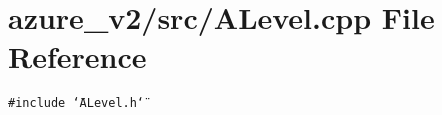 \section{azure\_\-v2/src/ALevel.cpp File Reference}
\label{ALevel_8cpp}
{\tt \#include \char`\"{}ALevel.h\char`\"{}}\par
